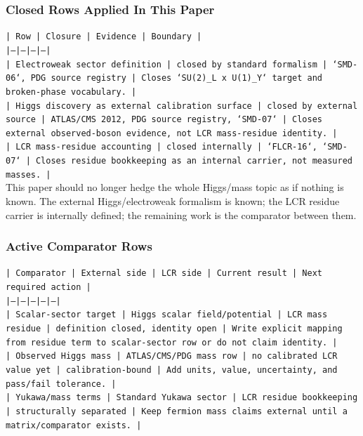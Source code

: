 \documentclass[11pt]{article}
\begin{document}
\subsubsection*{Closed Rows Applied In This Paper}

\noindent\texttt{| Row | Closure | Evidence | Boundary |}\\
\noindent\texttt{|---|---|---|---|}\\
\noindent\texttt{| Electroweak sector definition | closed by standard formalism | `SMD-06`, PDG source registry | Closes `SU(2)\_L x U(1)\_Y` target and broken-phase vocabulary. |}\\
\noindent\texttt{| Higgs discovery as external calibration surface | closed by external source | ATLAS/CMS 2012, PDG source registry, `SMD-07` | Closes external observed-boson evidence, not LCR mass-residue identity. |}\\
\noindent\texttt{| LCR mass-residue accounting | closed internally | `FLCR-16`, `SMD-07` | Closes residue bookkeeping as an internal carrier, not measured masses. |}\\

This paper should no longer hedge the whole Higgs/mass topic as if nothing is known. The external Higgs/electroweak formalism is known; the LCR residue carrier is internally defined; the remaining work is the comparator between them.

\subsubsection*{Active Comparator Rows}

\noindent\texttt{| Comparator | External side | LCR side | Current result | Next required action |}\\
\noindent\texttt{|---|---|---|---|---|}\\
\noindent\texttt{| Scalar-sector target | Higgs scalar field/potential | LCR mass residue | definition closed, identity open | Write explicit mapping from residue term to scalar-sector row or do not claim identity. |}\\
\noindent\texttt{| Observed Higgs mass | ATLAS/CMS/PDG mass row | no calibrated LCR value yet | calibration-bound | Add units, value, uncertainty, and pass/fail tolerance. |}\\
\noindent\texttt{| Yukawa/mass terms | Standard Yukawa sector | LCR residue bookkeeping | structurally separated | Keep fermion mass claims external until a matrix/comparator exists. |}\\
\end{document}

